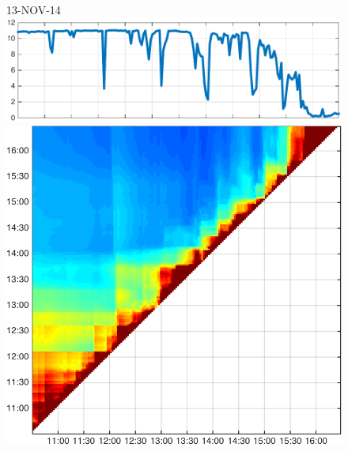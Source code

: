 \begin{figure}
\begin{minipage}[c]{\mylength}
\end{minipage}
\begin{minipage}[c]{\mylength}
\centering \scriptsize 13-NOV-14 \\
\includegraphics[valign=t,trim=0 0 5pt 0,angle=90,origin=tr,width=\sunintwidth,totalheight=\eventheight]{events/20141113-intensity.pdf}
\includegraphics[valign=t,width=\eventswidth]{events/20141113-maxGain-local-events.png}

\end{minipage}
\end{figure}
